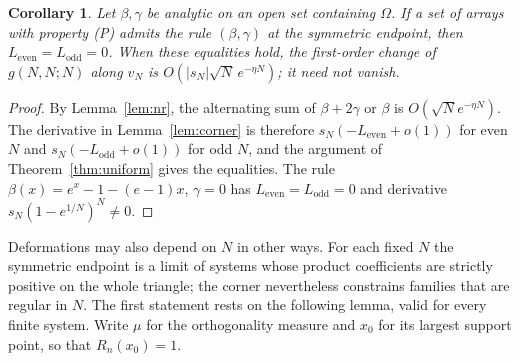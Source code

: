 \documentclass[twoside,10pt]{article}
\numberwithin{equation}{section}
\theoremstyle{slbody}
\newtheorem{corollary}[theorem]{Corollary}
\theoremstyle{definition}
\theoremstyle{remark}
\begin{document}
\begin{corollary}\label{cor:analytic-rules}
Let $\beta,\gamma$ be analytic on an open set containing $\Omega$. If a set of arrays with property (P) admits the rule $(\beta,\gamma)$ at the symmetric endpoint, then $L_{\mathrm{even}}=L_{\mathrm{odd}}=0$. When these equalities hold, the first-order change of $g(N,N;N)$ along $v_N$ is $O(|s_N|\sqrt N\,e^{-\eta N})$; it need not vanish.
\end{corollary}
\begin{proof}
By Lemma~\ref{lem:nr}, the alternating sum of $\beta+2\gamma$ or $\beta$ is $O(\sqrt Ne^{-\eta N})$. The derivative in Lemma~\ref{lem:corner} is therefore $s_N(-L_{\mathrm{even}}+o(1))$ for even $N$ and $s_N(-L_{\mathrm{odd}}+o(1))$ for odd $N$, and the argument of Theorem~\ref{thm:uniform} gives the equalities. The rule $\beta(x)=e^x-1-(e-1)x$, $\gamma=0$ has $L_{\mathrm{even}}=L_{\mathrm{odd}}=0$ and derivative $s_N(1-e^{1/N})^N\neq0$.
\end{proof}

Deformations may also depend on $N$ in other ways. For each fixed $N$ the symmetric endpoint is a limit of systems whose product coefficients are strictly positive on the whole triangle; the corner nevertheless constrains families that are regular in $N$. The first statement rests on the following lemma, valid for every finite system. Write $\mu$ for the orthogonality measure and $x_0$ for its largest support point, so that $R_n(x_0)=1$.
\end{document}
